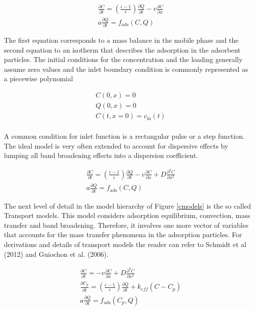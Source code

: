 \documentclass[paper=a4, fontsize=11pt]{scrartcl}
\begin{document}
\begin{align}
& \frac{\partial C}{\partial t} = \left(\frac{\epsilon-1}{\epsilon}\right) \frac{\partial Q}{\partial t}-v\frac{\partial C}{\partial x} \\
& a \frac{\partial Q}{\partial t} = f_{\text{ads}}(C,Q)
\end{align}

The first equation corresponds to a mass balance in the mobile phase and the second equation to an isotherm that describes the adsorption in the adsorbent particles. The initial conditions for the concentration and
the loading generally assume zero values and the inlet boundary condition is commonly represented as a piecewise polynomial

\begin{align*}
&C(0,x) = 0\\
&Q(0,x) = 0\\
&C(t,x=0) = c_{\text{in}}(t)\\
\end{align*}

A common condition for inlet function is a rectangular pulse or a step function. The ideal model is very often extended to account for dispersive effects by lumping all band broadening effects into a dispersion coefficient.

\begin{align}
& \frac{\partial C}{\partial t} = \left(\frac{\epsilon-1}{\epsilon}\right) \frac{\partial Q}{\partial t}-v\frac{\partial C}{\partial x} + D\frac{\partial^2C}{\partial x^2}\\
& a \frac{\partial Q}{\partial t} = f_{\text{ads}}(C,Q)
\end{align}

The next level of detail in the model hierarchy of Figure \ref{cmodels} is the so called Transport models. This model considers adsorption equilibrium, convection, mass transfer and band broadening. Therefore, it involves one more vector of variables that accounts for the mass transfer phenomena in the adsorption particles. For derivations and details of transport models the reader can refer to Schmidt et al (2012) and Guiochon et al. (2006). 

\begin{align}
& \frac{\partial C}{\partial t} = -v\frac{\partial C}{\partial x} + D\frac{\partial^2C}{\partial x^2} \\
& \frac{\partial C_p}{\partial t} = \left(\frac{\epsilon-1}{\epsilon}\right) \frac{\partial Q}{\partial t} + k_{eff}(C-C_p)\\
& a \frac{\partial Q}{\partial t} = f_{\text{ads}}(C_p,Q)
\end{align}
\end{document}
